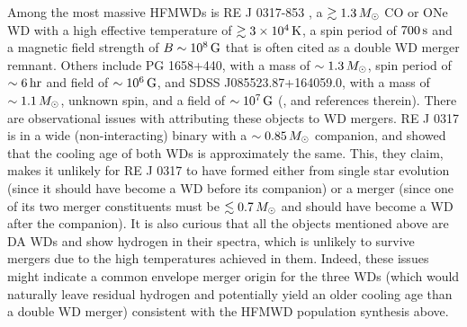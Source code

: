 

Among the most massive HFMWDs is RE J 0317-853 \citep{bars+95, kube+10}, a $\gtrsim1.3\,\Msun$ CO or ONe WD with a high effective temperature of $\gtrsim3\times10^4\,\mathrm{K}$, a spin period of $700\,\mathrm{s}$ and a magnetic field strength of $B\sim10^8\,\mathrm{G}$ that is often cited as a double WD merger remnant.  Others include PG 1658+440, with a mass of $\sim1.3\,\Msun$, spin period of $\sim6\,\mathrm{hr}$ and field of $\sim10^6\,\mathrm{G}$, and SDSS J085523.87+164059.0, with a mass of $\sim1.1\,\Msun$, unknown spin, and a field of $\sim10^7\,\mathrm{G}$ (\citealt{ferrdg15}, and references therein).  There are observational issues with attributing these objects to WD mergers.  RE J 0317 is in a wide (non-interacting) binary with a $\sim0.85\,\Msun$ companion, and \cite{kube+10} showed that the cooling age of both WDs is approximately the same.  This, they claim, makes it unlikely for RE J 0317 to have formed either from single star evolution (since it should have become a WD before its companion) or a merger (since one of its two merger constituents must be $\lesssim0.7\,\Msun$ and should have become a WD after the companion).  It is also curious that all the objects mentioned above are DA WDs and show hydrogen in their spectra, which is unlikely to survive mergers due to the high temperatures achieved in them.  Indeed, these issues might indicate a common envelope merger origin for the three WDs (which would naturally leave residual hydrogen and potentially yield an older cooling age than a double WD merger) consistent with the HFMWD population synthesis above.


